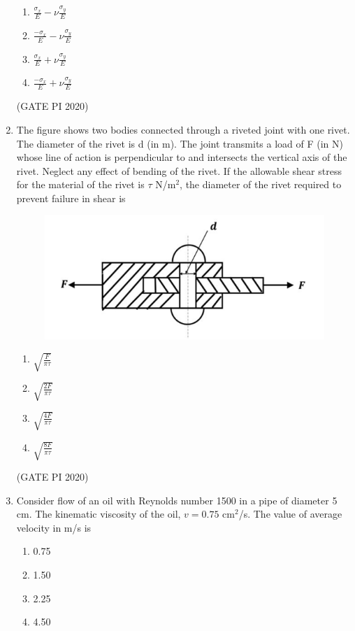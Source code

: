 \documentclass[journal,12pt,onecolumn]{IEEEtran}
\theoremstyle{remark}
\begin{document}
\begin{enumerate}
\begin{enumerate}
    \item $\frac{\sigma_x}{E} - \nu\frac{\sigma_y}{E}$
    \item $\frac{-\sigma_x}{E} - \nu\frac{\sigma_y}{E}$
    \item $\frac{\sigma_x}{E} + \nu\frac{\sigma_y}{E}$
    \item $\frac{-\sigma_x}{E} + \nu\frac{\sigma_y}{E}$
\end{enumerate}

\hfill (GATE PI 2020)

\item The figure shows two bodies connected through a riveted joint with one rivet. The diameter of the rivet is d (in m). The joint transmits a load of F (in N) whose line of action is perpendicular to and intersects the vertical axis of the rivet. Neglect any effect of bending of the rivet. If the allowable shear stress for the material of the rivet is $\tau$ N/m$^2$, the diameter of the rivet required to prevent failure in shear is

\newpage

\begin{figure}[h]
    \centering
    \includegraphics[width=0.5\columnwidth]{figs/fig9.png}
    \caption{}
    \label{fig:placeholder}
\end{figure}

\begin{enumerate}
    \item $\sqrt{\frac{F}{\pi \tau}}$
    \item $\sqrt{\frac{2F}{\pi \tau}}$
    \item $\sqrt{\frac{4F}{\pi \tau}}$
    \item $\sqrt{\frac{8F}{\pi \tau}}$
\end{enumerate}

\hfill (GATE PI 2020)

\item Consider flow of an oil with Reynolds number 1500 in a pipe of diameter 5 cm. The kinematic viscosity of the oil, $v = 0.75$ cm$^2$/s. The value of average velocity in m/s is

\begin{enumerate}
    \item 0.75
    \item 1.50
    \item 2.25
    \item 4.50
\end{enumerate}


\end{enumerate}
\end{document}
